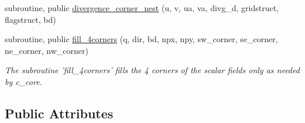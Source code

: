\begin{DoxyCompactItemize}
subroutine, public \hyperlink{classsw__core__mod_a23884be4fc96b5faf577060479bf7056}{divergence\-\_\-corner\-\_\-nest} (u, v, ua, va, divg\-\_\-d, gridstruct, flagstruct, bd)
\item 
subroutine, public \hyperlink{classsw__core__mod_a393c161c0bd85b54a22341a984829030}{fill\-\_\-4corners} (q, dir, bd, npx, npy, sw\-\_\-corner, se\-\_\-corner, ne\-\_\-corner, nw\-\_\-corner)
\begin{DoxyCompactList}\small\item\em The subroutine 'fill\-\_\-4corners' fills the 4 corners of the scalar fields only as needed by c\-\_\-core. \end{DoxyCompactList}\end{DoxyCompactItemize}
\subsection*{Public Attributes}
